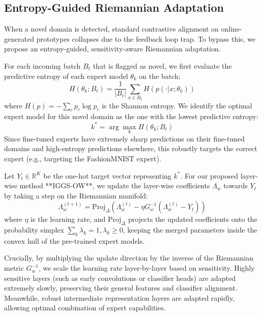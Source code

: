 \documentclass{article}
\theoremstyle{plain}
\theoremstyle{definition}
\theoremstyle{remark}
\begin{document}
\subsection{Entropy-Guided Riemannian Adaptation}
When a novel domain is detected, standard contrastive alignment on online-generated prototypes collapses due to the feedback loop trap. To bypass this, we propose an entropy-guided, sensitivity-aware Riemannian adaptation.

For each incoming batch $B_t$ that is flagged as novel, we first evaluate the predictive entropy of each expert model $\theta_k$ on the batch:
\begin{equation}
    H(\theta_k; B_t) = \frac{1}{|B_t|} \sum_{x \in B_t} H\left(p(\cdot | x; \theta_k)\right)
\end{equation}
where $H(p) = - \sum_c p_c \log p_c$ is the Shannon entropy.
We identify the optimal expert model for this novel domain as the one with the lowest predictive entropy:
\begin{equation}
    k^* = \arg\max_k H(\theta_k; B_t)
\end{equation}
Since fine-tuned experts have extremely sharp predictions on their fine-tuned domains and high-entropy predictions elsewhere, this robustly targets the correct expert (e.g., targeting the FashionMNIST expert).

Let $Y_t \in \mathbb{R}^K$ be the one-hot target vector representing $k^*$. For our proposed layer-wise method **IGGS-OW**, we update the layer-wise coefficients $\Lambda_w$ towards $Y_t$ by taking a step on the Riemannian manifold:
\begin{equation}
    \Lambda_w^{(t+1)} = \text{Proj}_{\Delta} \left( \Lambda_w^{(t)} - \eta G_w^{-1} \left( \Lambda_w^{(t)} - Y_t \right) \right)
\end{equation}
where $\eta$ is the learning rate, and $\text{Proj}_{\Delta}$ projects the updated coefficients onto the probability simplex $\sum_k \lambda_k = 1, \lambda_k \geq 0$, keeping the merged parameters inside the convex hull of the pre-trained expert models.

Crucially, by multiplying the update direction by the inverse of the Riemannian metric $G_w^{-1}$, we scale the learning rate layer-by-layer based on sensitivity. Highly sensitive layers (such as early convolutions or classifier heads) are adapted extremely slowly, preserving their general features and classifier alignment. Meanwhile, robust intermediate representation layers are adapted rapidly, allowing optimal combination of expert capabilities.
\end{document}
